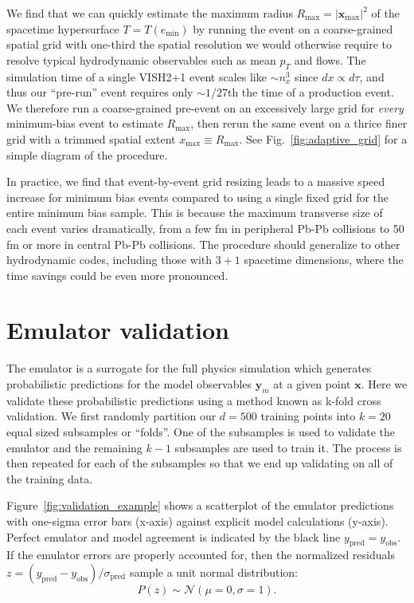 \documentclass[aps,prc,reprint,amsmath,nofootinbib]{revtex4-1}
\newcommand{\x}{\mathbf{x}}
\newcommand{\y}{\mathbf{y}}
\begin{document}
We find that we can quickly estimate the maximum radius $R_\text{max} = |\x_\text{max}|^2$ of the spacetime hypersurface ${T = T(e_\text{min})}$ by running the event on a coarse-grained spatial grid with one-third the spatial resolution we would otherwise require to resolve typical hydrodynamic observables such as mean $p_T$ and flows.
The simulation time of a single \textsc{VISH2+1} event scales like ${\sim}n_x^3$ since $dx \propto d\tau$, and thus our ``pre-run'' event requires only ${\sim}1/27$th the time of a production event.
We therefore run a coarse-grained pre-event on an excessively large grid for \emph{every} minimum-bias event to estimate $R_\text{max}$, then rerun the same event on a thrice finer grid with a trimmed spatial extent $x_\text{max} \equiv R_\text{max}$.
See Fig.~\ref{fig:adaptive_grid} for a simple diagram of the procedure.

In practice, we find that event-by-event grid resizing leads to a massive speed increase for minimum bias events compared to using a single fixed grid for the entire minimum bias sample.
This is because the maximum transverse size of each event varies dramatically, from a few fm in peripheral Pb-Pb collisions to 50 fm or more in central Pb-Pb collisions.
The procedure should generalize to other hydrodynamic codes, including those with $3+1$ spacetime dimensions, where the time savings could be even more pronounced.

\section{Emulator validation}
\label{app:validation}

The emulator is a surrogate for the full physics simulation which generates probabilistic predictions for the model observables $\y_m$ at a given point $\x$.
Here we validate these probabilistic predictions using a method known as k-fold cross validation.
We first randomly partition our $d=500$ training points into $k=20$ equal sized subsamples or ``folds''.
One of the subsamples is used to validate the emulator and the remaining $k-1$ subsamples are used to train it.
The process is then repeated for each of the subsamples so that we end up validating on all of the training data.

Figure~\ref{fig:validation_example} shows a scatterplot of the emulator predictions with one-sigma error bars (x-axis) against explicit model calculations (y-axis).
Perfect emulator and model agreement is indicated by the black line $y_\text{pred} = y_\text{obs}$.
If the emulator errors are properly accounted for, then the normalized residuals ${z=(y_\text{pred} - y_\text{obs})/\sigma_\text{pred}}$ sample a unit normal distribution:
\begin{equation}
  P(z) \sim \mathcal{N}(\mu=0,\sigma=1).
\end{equation}
\end{document}

